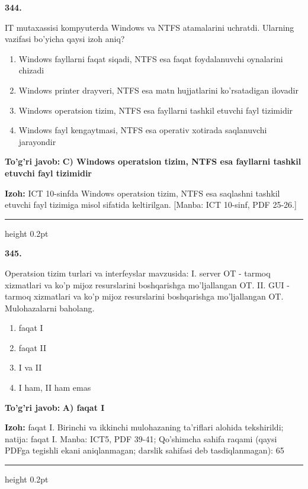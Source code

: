 \documentclass[10pt,a4paper]{article}
\begin{document}
{\bfseries\sffamily\color{ink} 344.}
\par
IT mutaxassisi kompyuterda Windows va NTFS atamalarini uchratdi. Ularning vazifasi bo'yicha qaysi izoh aniq?
\begin{enumerate}[label=\Alph*),leftmargin=9mm]
\item Windows fayllarni faqat siqadi, NTFS esa faqat foydalanuvchi oynalarini chizadi
\item Windows printer drayveri, NTFS esa matn hujjatlarini ko'rsatadigan ilovadir
\item Windows operatsion tizim, NTFS esa fayllarni tashkil etuvchi fayl tizimidir
\item Windows fayl kengaytmasi, NTFS esa operativ xotirada saqlanuvchi jarayondir
\end{enumerate}
\begin{tcolorbox}[enhanced,breakable,colback=teal!4,colframe=teal!60!black,boxrule=0.45pt,arc=1.2mm,left=2.7mm,right=2.7mm,top=1.8mm,bottom=1.8mm,before skip=2mm,after skip=2mm]
{\bfseries\sffamily\color{teal}To'g'ri javob:} \textbf{C) Windows operatsion tizim, NTFS esa fayllarni tashkil etuvchi fayl tizimidir}
\par\smallskip
{\bfseries Izoh:} ICT 10-sinfda Windows operatsion tizim, NTFS esa saqlashni tashkil etuvchi fayl tizimiga misol sifatida keltirilgan. [Manba: ICT 10-sinf, PDF 25-26.]
\end{tcolorbox}
\vspace{2mm}\hrule height 0.2pt\vspace{3mm}

{\bfseries\sffamily\color{ink} 345.}
\par
Operatsion tizim turlari va interfeyslar mavzusida: I. server OT - tarmoq xizmatlari va ko'p mijoz resurslarini boshqarishga mo'ljallangan OT. II. GUI - tarmoq xizmatlari va ko'p mijoz resurslarini boshqarishga mo'ljallangan OT. Mulohazalarni baholang.
\begin{enumerate}[label=\Alph*),leftmargin=9mm]
\item faqat I
\item faqat II
\item I va II
\item I ham, II ham emas
\end{enumerate}
\begin{tcolorbox}[enhanced,breakable,colback=teal!4,colframe=teal!60!black,boxrule=0.45pt,arc=1.2mm,left=2.7mm,right=2.7mm,top=1.8mm,bottom=1.8mm,before skip=2mm,after skip=2mm]
{\bfseries\sffamily\color{teal}To'g'ri javob:} \textbf{A) faqat I}
\par\smallskip
{\bfseries Izoh:} faqat I. Birinchi va ikkinchi mulohazaning ta'riflari alohida tekshirildi; natija: faqat I. Manba: ICT5, PDF 39-41; Qo'shimcha sahifa raqami (qaysi PDFga tegishli ekani aniqlanmagan; darslik sahifasi deb tasdiqlanmagan): 65
\end{tcolorbox}
\vspace{2mm}\hrule height 0.2pt\vspace{3mm}
\end{document}
